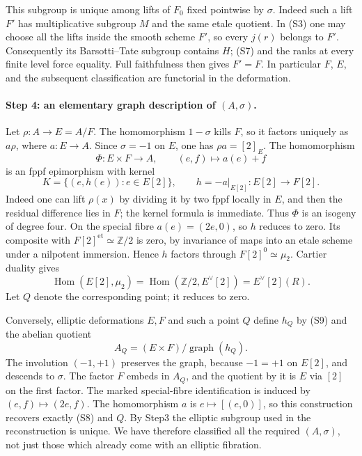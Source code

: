 This subgroup is unique among lifts of $F_0$ fixed pointwise by
$\sigma$. Indeed such a lift $F'$ has multiplicative subgroup $M$
and the same etale quotient. In (S3) one may choose all the lifts
inside the smooth scheme $F'$, so every $j(r)$ belongs to $F'$.
Consequently its Barsotti--Tate subgroup contains $H$; (S7) and
the ranks at every finite level force equality. Full faithfulness
then gives $F'=F$. In particular $F$, $E$, and the subsequent
classification are functorial in the deformation.

\paragraph{Step 4: an elementary graph description of $(A,\sigma)$.}
Let $\rho:A\to E=A/F$. The homomorphism $1-\sigma$ kills $F$, so
it factors uniquely as $a\rho$, where $a:E\to A$. Since
$\sigma=-1$ on $E$, one has $\rho a=[2]_E$.
The homomorphism
\[
 \Phi:E\times F\longrightarrow A,\qquad(e,f)\longmapsto a(e)+f
\]
is an fppf epimorphism with kernel
\[
 K=\{(e,h(e)):e\in E[2]\},\qquad
 h=-a|_{E[2]}:E[2]\longrightarrow F[2].                 \tag{S8}
\]
Indeed one can lift $\rho(x)$ by dividing it by two fppf locally in
$E$, and then the residual difference lies in $F$; the kernel formula
is immediate. Thus $\Phi$ is an isogeny of degree four.
On the special fibre $a(e)=(2e,0)$, so $h$ reduces to zero.
Its composite with $F[2]^{\mathrm{et}}\simeq\mathbb Z/2$ is
zero, by invariance of maps into an etale scheme under a nilpotent
immersion. Hence $h$ factors through $F[2]^0\simeq\mu_2$.
Cartier duality gives
\[
 \operatorname{Hom}(E[2],\mu_2)
  =\operatorname{Hom}(\mathbb Z/2,E^\vee[2])
  =E^\vee[2](R).                                       \tag{S9}
\]
Let $Q$ denote the corresponding point; it reduces to zero.

Conversely, elliptic deformations $E,F$ and such a point $Q$ define
$h_Q$ by (S9) and the abelian quotient
\[
 A_Q=(E\times F)/\operatorname{graph}(h_Q).               \tag{S10}
\]
The involution $(-1,+1)$ preserves the graph, because $-1=+1$ on
$E[2]$, and descends to $\sigma$. The factor $F$ embeds in $A_Q$,
and the quotient by it is $E$ via $[2]$ on the first factor.
The marked special-fibre identification is induced by
$(e,f)\mapsto(2e,f)$. The homomorphism $a$ is $e\mapsto[(e,0)]$,
so this construction recovers exactly (S8) and $Q$. By Step3 the
elliptic subgroup used in the reconstruction is unique. We have
therefore classified all the required $(A,\sigma)$, not just those
which already come with an elliptic fibration.


